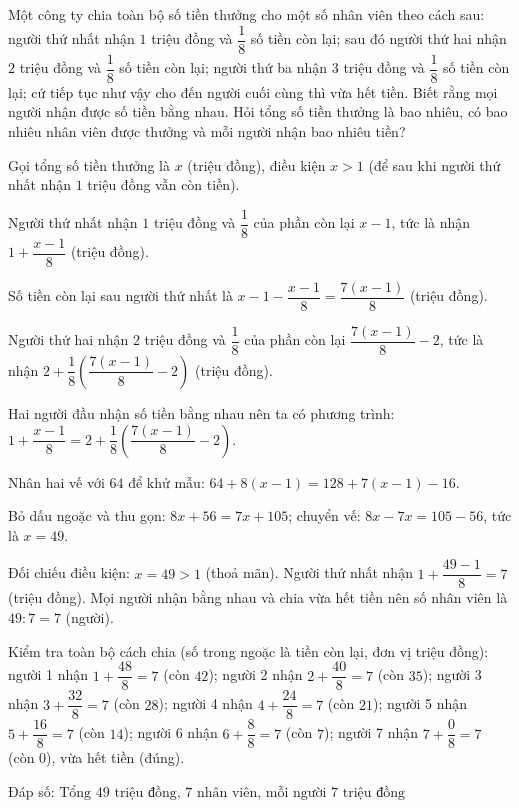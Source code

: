 \begin{problem}[8DS-PT1-020]
Một công ty chia toàn bộ số tiền thưởng cho một số nhân viên theo cách sau: người thứ nhất nhận $1$ triệu đồng và $\dfrac{1}{8}$ số tiền còn lại; sau đó người thứ hai nhận $2$ triệu đồng và $\dfrac{1}{8}$ số tiền còn lại; người thứ ba nhận $3$ triệu đồng và $\dfrac{1}{8}$ số tiền còn lại; cứ tiếp tục như vậy cho đến người cuối cùng thì vừa hết tiền. Biết rằng mọi người nhận được số tiền bằng nhau. Hỏi tổng số tiền thưởng là bao nhiêu, có bao nhiêu nhân viên được thưởng và mỗi người nhận bao nhiêu tiền?

\begin{solution}
Gọi tổng số tiền thưởng là $x$ (triệu đồng), điều kiện $x > 1$ (để sau khi người thứ nhất nhận $1$ triệu đồng vẫn còn tiền).

Người thứ nhất nhận $1$ triệu đồng và $\dfrac{1}{8}$ của phần còn lại $x - 1$, tức là nhận $1 + \dfrac{x - 1}{8}$ (triệu đồng).

Số tiền còn lại sau người thứ nhất là $x - 1 - \dfrac{x - 1}{8} = \dfrac{7(x - 1)}{8}$ (triệu đồng).

Người thứ hai nhận $2$ triệu đồng và $\dfrac{1}{8}$ của phần còn lại $\dfrac{7(x - 1)}{8} - 2$, tức là nhận $2 + \dfrac{1}{8}\left(\dfrac{7(x - 1)}{8} - 2\right)$ (triệu đồng).

Hai người đầu nhận số tiền bằng nhau nên ta có phương trình: $1 + \dfrac{x - 1}{8} = 2 + \dfrac{1}{8}\left(\dfrac{7(x - 1)}{8} - 2\right)$.

Nhân hai vế với $64$ để khử mẫu: $64 + 8(x - 1) = 128 + 7(x - 1) - 16$.

Bỏ dấu ngoặc và thu gọn: $8x + 56 = 7x + 105$; chuyển vế: $8x - 7x = 105 - 56$, tức là $x = 49$.

Đối chiếu điều kiện: $x = 49 > 1$ (thoả mãn). Người thứ nhất nhận $1 + \dfrac{49 - 1}{8} = 7$ (triệu đồng). Mọi người nhận bằng nhau và chia vừa hết tiền nên số nhân viên là $49 : 7 = 7$ (người).

Kiểm tra toàn bộ cách chia (số trong ngoặc là tiền còn lại, đơn vị triệu đồng): người 1 nhận $1 + \dfrac{48}{8} = 7$ (còn $42$); người 2 nhận $2 + \dfrac{40}{8} = 7$ (còn $35$); người 3 nhận $3 + \dfrac{32}{8} = 7$ (còn $28$); người 4 nhận $4 + \dfrac{24}{8} = 7$ (còn $21$); người 5 nhận $5 + \dfrac{16}{8} = 7$ (còn $14$); người 6 nhận $6 + \dfrac{8}{8} = 7$ (còn $7$); người 7 nhận $7 + \dfrac{0}{8} = 7$ (còn $0$), vừa hết tiền (đúng).

Đáp số: $\boxed{\text{Tổng } 49 \text{ triệu đồng, } 7 \text{ nhân viên, mỗi người } 7 \text{ triệu đồng}}$
\end{solution}
\end{problem}

